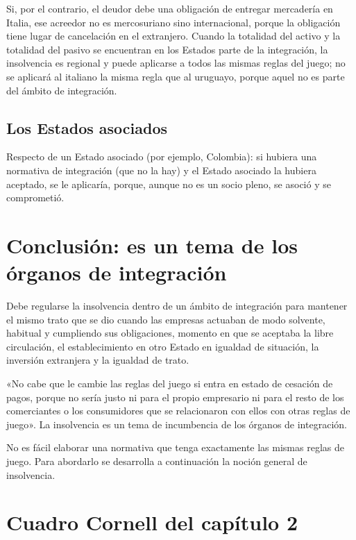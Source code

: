 \documentclass[12pt,oneside]{book}
\begin{document}
Si, por el contrario, el deudor debe una obligación de entregar mercadería en Italia, ese acreedor no es mercosuriano sino internacional, porque la obligación tiene lugar de cancelación en el extranjero. Cuando la totalidad del activo y la totalidad del pasivo se encuentran en los Estados parte de la integración, la insolvencia es regional y puede aplicarse a todos las mismas reglas del juego; no se aplicará al italiano la misma regla que al uruguayo, porque aquel no es parte del ámbito de integración.

\subsection{Los Estados asociados}

Respecto de un Estado asociado (por ejemplo, Colombia): si hubiera una normativa de integración (que no la hay) y el Estado asociado la hubiera aceptado, se le aplicaría, porque, aunque no es un socio pleno, se asoció y se comprometió.

\section{Conclusión: es un tema de los órganos de integración}

Debe regularse la insolvencia dentro de un ámbito de integración para mantener el mismo trato que se dio cuando las empresas actuaban de modo solvente, habitual y cumpliendo sus obligaciones, momento en que se aceptaba la libre circulación, el establecimiento en otro Estado en igualdad de situación, la inversión extranjera y la igualdad de trato.

\begin{important}
«No cabe que le cambie las reglas del juego si entra en estado de cesación de pagos, porque no sería justo ni para el propio empresario ni para el resto de los comerciantes o los consumidores que se relacionaron con ellos con otras reglas de juego». La insolvencia es un tema de incumbencia de los órganos de integración.
\end{important}

No es fácil elaborar una normativa que tenga exactamente las mismas reglas de juego. Para abordarlo se desarrolla a continuación la noción general de insolvencia.

\section{Cuadro Cornell del capítulo 2}
\end{document}
